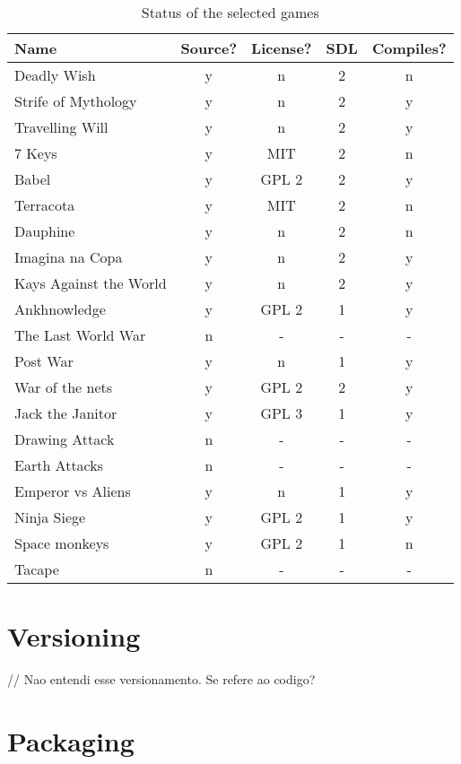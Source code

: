 \begin{table}[h!]
\centering
\caption{Status of the selected games}
\label{tab:first_games}
\begin{tabular}{|l|c|c|c|c|}
\hline
\textbf{Name} & \textbf{Source?} & \textbf{License?} & \textbf{SDL} & \textbf{Compiles?} \\ \hline
Deadly Wish & y & n & 2 & n \\ \hline
Strife of Mythology & y & n & 2 & y \\ \hline
Travelling Will & y & n & 2 & y \\ \hline
7 Keys & y & MIT & 2 & n \\ \hline
Babel & y & GPL 2 & 2 & y \\ \hline
Terracota & y & MIT & 2 & n \\ \hline
Dauphine & y & n & 2 & n \\ \hline
Imagina na Copa & y & n & 2 & y \\ \hline
Kays Against the World & y & n & 2 & y \\ \hline
Ankhnowledge & y & GPL 2 & 1 & y \\ \hline
The Last World War & n & - & - & - \\ \hline
Post War & y & n & 1 & y \\ \hline
War of the nets & y & GPL 2 & 2 & y \\ \hline
Jack the Janitor & y & GPL 3 & 1 & y \\ \hline
Drawing Attack & n & - & - & - \\ \hline
Earth Attacks & n & - & - & - \\ \hline
Emperor vs Aliens & y & n & 1 & y \\ \hline
Ninja Siege & y & GPL 2 & 1 & y \\ \hline
Space monkeys & y & GPL 2 & 1 & n \\ \hline
Tacape & n & - & - & - \\ \hline
\end{tabular}
\end{table}


\section[Versioning]{Versioning}

// Nao entendi esse versionamento. Se refere ao codigo?

\section[Packaging]{Packaging}

